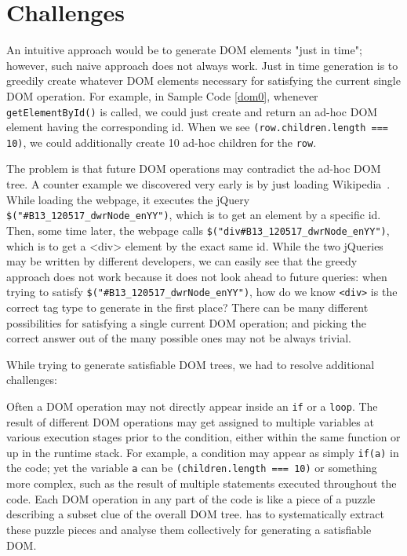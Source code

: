 \section{Challenges}
An intuitive approach would be to generate DOM elements "just in time"; however, such naive approach does not always work.  
Just in time generation is to greedily create whatever DOM elements necessary for satisfying the current single DOM operation.  
For example, in Sample Code \ref{dom0}, whenever {\tt getElementById()} is called, we could just create and return an ad-hoc DOM element having the corresponding id.  
When we see {\tt (row.children.length === 10)}, we could additionally create 10 ad-hoc children for the {\tt row}.  

The problem is that future DOM operations may contradict the ad-hoc DOM tree.  
A counter example we discovered very early is by just loading Wikipedia~\cite{wikipedia}.  
While loading the webpage, it executes the jQuery {\tt \$("\#B13\_120517\_dwrNode\_enYY")}, which is to get an element by a specific id.  
Then, some time later, the webpage calls {\tt \$("div\#B13\_120517\_dwrNode\_enYY")}, which is to get a <div> element by the exact same id.  
While the two jQueries may be written by different developers, we can easily see that the greedy approach does not work because it does not look ahead to future queries: when trying to satisfy {\tt \$("\#B13\_120517\_dwrNode\_enYY")}, how do we know {\tt <div>} is the correct tag type to generate in the first place?  
There can be many different possibilities for satisfying a single current DOM operation; and picking the correct answer out of the many possible ones may not be always trivial.  

While trying to generate satisfiable DOM trees, we had to resolve additional challenges:  

Often a DOM operation may not directly appear inside an {\tt if} or a {\tt loop}.  
The result of different DOM operations may get assigned to multiple variables at various execution stages prior to the condition, either within the same function or up in the runtime stack.  
For example, a condition may appear as simply {\tt if(a)} in the code; yet the variable {\tt a} can be {\tt (children.length === 10)} or something more complex, such as the result of multiple statements executed throughout the code.  
Each DOM operation in any part of the code is like a piece of a puzzle describing a subset clue of the overall DOM tree.  \tool has to systematically extract these puzzle pieces and analyse them collectively for generating a satisfiable DOM.  

